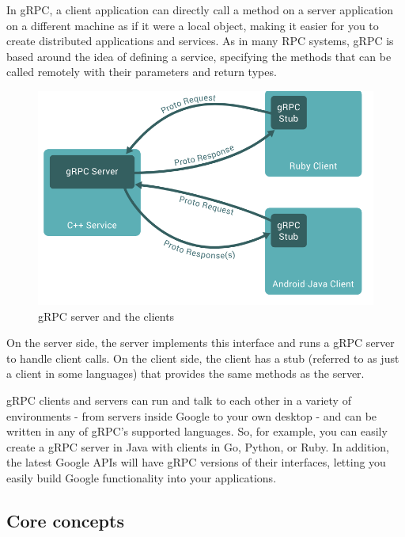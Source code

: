 	In gRPC, a client application can directly call a method on a server application on a different machine as if it were a local object, 
	making it easier for you to create distributed applications and services. As in many RPC systems, gRPC is based around the idea of 
	defining a service, specifying the methods that can be called remotely with their parameters and return types. \cite{grpcspec}
	
	\begin{figure}[h!]
		\begin{center}
			\includegraphics[scale=0.8]{include/imgs/grpc_works.PNG}	
		\end{center}
		\caption{gRPC server and the clients \cite{grpcspec}}
	\end{figure}

	On the server side, the server implements this interface and runs a gRPC server to handle client calls. On the client side, the
	client has a stub (referred to as just a client in some languages) that provides the same methods as the server.

	gRPC clients and servers can run and talk to each other in a variety of environments - from servers inside Google to your own desktop - 
	and can be written in any of gRPC’s supported languages. So, for example, you can easily create a gRPC server in Java with clients 
	in Go, Python, or Ruby. In addition, the latest Google APIs will have gRPC versions of their interfaces, letting you easily build Google functionality 
	into your applications.

	\subsection{Core concepts}

